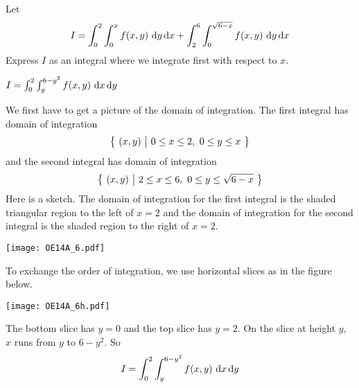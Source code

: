 \begin{question}[M200 2014A] %
Let
\begin{equation*}
I = \int_0^2 \int_0^x f(x,y)\ \dee{y}\,\dee{x}
    + \int_2^6 \int_0^{\sqrt{6-x}} f(x,y)\ \dee{y}\,\dee{x}
\end{equation*}
Express $I$ as an integral where we integrate first with respect to $x$.
\end{question}

%

\begin{answer}
 $I = \int_0^2 \int_y^{6-y^2} f(x,y)\ \dee{x}\,\dee{y}$
\end{answer}

\begin{solution}
We first have to get a picture of the domain of integration.
The first integral has domain of integration
\begin{equation*}
\big\{ \ (x,y)\ \big|\ 0\le x\le 2,\ 0\le y\le x\ \big\}
\end{equation*} 
and the second integral has domain of integration
\begin{equation*}
\big\{ \ (x,y)\ \big|\ 2\le x\le 6,\ 0\le y\le \sqrt{6-x}\ \big\}
\end{equation*} 
Here is a sketch. The domain of integration for the first integral
is the shaded triangular region to the left of $x=2$ and the domain
of integration for the second integral is the shaded region to the right
of $x=2$.

\begin{center}
     \texttt{[image: OE14A\_6.pdf]}
\end{center}

To exchange the order of integration, we use horizontal slices as in the
figure below.

\begin{center}
     \texttt{[image: OE14A\_6h.pdf]}
\end{center}

The bottom slice has $y=0$ and the top slice has $y=2$.
On the slice at height $y$, $x$ runs from $y$ to $6-y^2$. So
\begin{equation*}
I = \int_0^2 \int_y^{6-y^2} f(x,y)\ \dee{x}\,\dee{y}
\end{equation*}
\end{solution}

